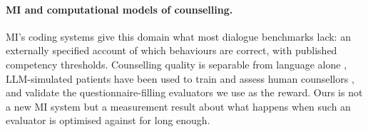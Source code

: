 \paragraph{MI and computational models of counselling.} MI's coding systems
\citep{moyers2016miti} give this domain what most dialogue benchmarks lack: an externally
specified account of which behaviours are correct, with published competency thresholds.
Counselling quality is separable from language alone \citep{perezrosas2019goodcounselor},
LLM-simulated patients have been used to train and assess human counsellors
\citep{steenstra2025scaffolding}, and \citet{yosef2024assessing} validate the
questionnaire-filling evaluators we use as the reward. Ours is not a new MI system but a
measurement result about what happens when such an evaluator is optimised against for long
enough.
